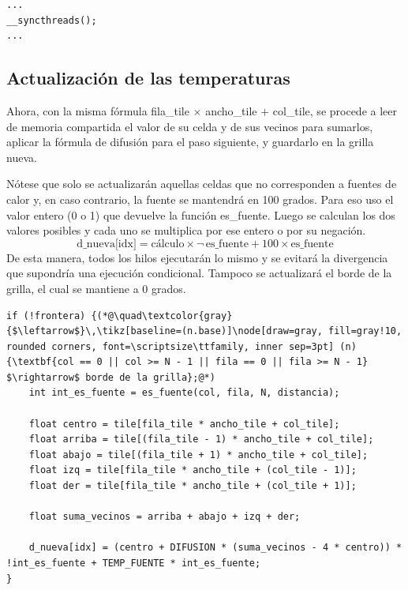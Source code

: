 \begin{lstlisting}[firstnumber=135]
...
__syncthreads();
...
\end{lstlisting}

\subsection{Actualización de las temperaturas}
Ahora, con la misma fórmula fila\_tile $\times$ ancho\_tile $+$ col\_tile, se procede a leer de memoria compartida el valor de su celda y de sus vecinos para sumarlos, aplicar la fórmula de difusión para el paso siguiente, y guardarlo en la grilla nueva.

Nótese que solo se actualizarán aquellas celdas que no corresponden a fuentes de calor y, en caso contrario, la fuente se mantendrá en 100 grados. Para eso uso el valor entero (0 o 1) que devuelve la función es\_fuente. Luego se calculan los dos valores posibles y cada uno se multiplica por ese entero o por su negación.
\[
\text{d\_nueva[idx]} = \text{cálculo} \times \lnot\,\text{es\_fuente} + 100 \times \text{es\_fuente}
\]
De esta manera, todos los hilos ejecutarán lo mismo y se evitará la divergencia que supondría una ejecución condicional. Tampoco se actualizará el borde de la grilla, el cual se mantiene a 0 grados.

\begin{lstlisting}[firstnumber=138]
if (!frontera) {(*@\quad\textcolor{gray}{$\leftarrow$}\,\tikz[baseline=(n.base)]\node[draw=gray, fill=gray!10, rounded corners, font=\scriptsize\ttfamily, inner sep=3pt] (n) {\textbf{col == 0 || col >= N - 1 || fila == 0 || fila >= N - 1} $\rightarrow$ borde de la grilla};@*)
    int int_es_fuente = es_fuente(col, fila, N, distancia);

    float centro = tile[fila_tile * ancho_tile + col_tile];
    float arriba = tile[(fila_tile - 1) * ancho_tile + col_tile];
    float abajo = tile[(fila_tile + 1) * ancho_tile + col_tile];
    float izq = tile[fila_tile * ancho_tile + (col_tile - 1)];
    float der = tile[fila_tile * ancho_tile + (col_tile + 1)];

    float suma_vecinos = arriba + abajo + izq + der;

    d_nueva[idx] = (centro + DIFUSION * (suma_vecinos - 4 * centro)) * !int_es_fuente + TEMP_FUENTE * int_es_fuente;
}
\end{lstlisting}